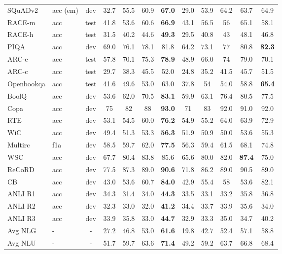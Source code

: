 \documentclass{article}
\begin{document}
\begin{table*}[htb]
\begin{tabular}{llcccccccccc}
        SQuADv2 & acc (em) & dev & 32.7 & 55.5 & 60.9 & \textbf{67.0} & 29.0 & 53.9 & 64.2 & 63.7 & 64.9\\
        RACE-m & acc & test & 41.8 & 53.6 & 60.6 & \textbf{66.9} & 43.1 & 56.5 & 56 & 65.1 & 58.1\\
        RACE-h & acc & test & 31.5 & 40.2 & 44.6 & \textbf{49.3} & 29.5 & 40.8 & 43 & 48.1 & 46.8\\
        \addlinespace
        PIQA & acc & dev & 69.0 & 76.1 & 78.1 & 81.8 & 64.2 & 73.1 & 77 & 80.8 & \textbf{82.3}\\
        ARC-e & acc & test & 57.8 & 70.1 & 75.3 & \textbf{78.9} & 48.9 & 66.0 & 74 & 79.0 & 70.1\\
        ARC-c & acc & test & 29.7 & 38.3 & 45.5 & 52.0 & 24.8 & 35.2 & 41.5 & 45.7 & 51.5\\
        Openbookqa & acc & test & 41.6 & 49.6 & 53.0 & 63.0 & 37.8 & 54 & 54.0 & 58.8 & \textbf{65.4}\\
        \addlinespace
        BoolQ & acc & dev & 53.6 & 62.0 & 70.5 & \textbf{83.1} & 59.9 & 63.1 & 76.4 & 80.5 & 77.5\\
        Copa & acc & dev & 75 & 82 & 88 & \textbf{93.0} & 71 & 83 & 92.0 & 91.0 & 92.0\\
        RTE & acc & dev & 53.1 & 54.5 & 60.0 & \textbf{76.2} & 54.9 & 55.2 & 64.0 & 63.9 & 72.9\\
        WiC & acc & dev & 49.4 & 51.3 & 53.3 & \textbf{56.3} & 51.9 & 50.9 & 50.0 & 53.6 & 55.3\\
        Multirc & f1a & dev & 58.5 & 59.7 & 62.0 & \textbf{77.5} & 56.3 & 59.4 & 61.5 & 68.1 & 74.8\\
        WSC & acc & dev & 67.7 & 80.4 & 83.8 & 85.6 & 65.6 & 80.0 & 82.0 & \textbf{87.4} & 75.0\\
        ReCoRD & acc & dev & 77.5 & 87.3 & 89.0 & \textbf{90.6} & 71.8 & 86.2 & 89.0 & 90.5 & 89.0\\
        CB & acc & dev & 43.0 & 53.6 & 60.7 & \textbf{84.0} & 42.9 & 55.4 & 58 & 53.6 & 82.1\\
        \addlinespace
        ANLI R1 & acc & dev & 34.3 & 31.4 & 34.0 & \textbf{44.3} & 33.5 & 33.1 & 33.2 & 35.8 & 36.8\\
        ANLI R2 & acc & dev & 32.3 & 33.0 & 32.0 & \textbf{41.2} & 34.4 & 33.7 & 33.9 & 35.6 & 34.0\\
        ANLI R3 & acc & dev & 33.9 & 35.8 & 33.0 & \textbf{44.7} & 32.9 & 33.3 & 35.0 & 34.7 & 40.2\\
        \addlinespace
        Avg NLG & - & - & 27.2 & 46.8 & 53.0 & \textbf{61.6} & 19.8 & 42.7 & 52.4 & 57.1 & 58.8 \\ 
        Avg NLU & - & - & 51.7 & 59.7 & 63.6 & \textbf{71.4} & 49.2 & 59.2 & 63.7 & 66.8 & 68.4\\
        \bottomrule
    \end{tabular}
\end{table*}
\end{document}

